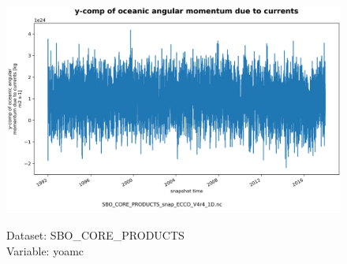 \begin{figure}[H]
\centering
\includegraphics[scale=0.5]{../images/plots/oneD_plots/SBO_Core_Products/yoamc.png}
\caption{\\Dataset: SBO\_CORE\_PRODUCTS\\Variable: yoamc}
\label{tab:table-SBO_CORE_PRODUCTS_yoamc-Plot}
\end{figure}
\pagebreak
